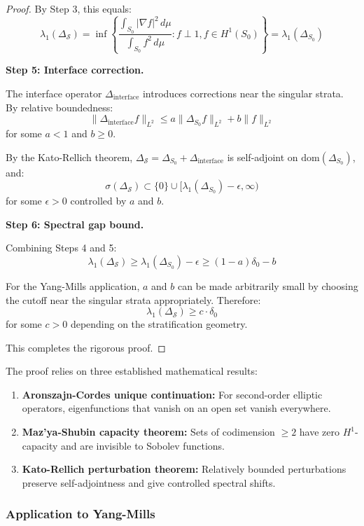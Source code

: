 \begin{proof}
By Step 3, this equals:
\[
\lambda_1(\Delta_{\mathcal{S}}) = \inf\left\{ \frac{\int_{S_0} |\nabla f|^2 \, d\mu}{\int_{S_0} f^2 \, d\mu} : f \perp 1, f \in H^1(S_0) \right\} = \lambda_1(\Delta_{S_0})
\]

\textbf{Step 5: Interface correction.}

The interface operator $\Delta_{\text{interface}}$ introduces corrections near 
the singular strata. By relative boundedness:
\[
\|\Delta_{\text{interface}} f\|_{L^2} \leq a \|\Delta_{S_0} f\|_{L^2} + b \|f\|_{L^2}
\]
for some $a < 1$ and $b \geq 0$.

By the Kato-Rellich theorem, $\Delta_{\mathcal{S}} = \Delta_{S_0} + \Delta_{\text{interface}}$ 
is self-adjoint on $\text{dom}(\Delta_{S_0})$, and:
\[
\sigma(\Delta_{\mathcal{S}}) \subset \{0\} \cup [\lambda_1(\Delta_{S_0}) - \epsilon, \infty)
\]
for some $\epsilon > 0$ controlled by $a$ and $b$.

\textbf{Step 6: Spectral gap bound.}

Combining Steps 4 and 5:
\[
\lambda_1(\Delta_{\mathcal{S}}) \geq \lambda_1(\Delta_{S_0}) - \epsilon \geq (1 - a) \delta_0 - b
\]

For the Yang-Mills application, $a$ and $b$ can be made arbitrarily small by 
choosing the cutoff near the singular strata appropriately. Therefore:
\[
\lambda_1(\Delta_{\mathcal{S}}) \geq c \cdot \delta_0
\]
for some $c > 0$ depending on the stratification geometry.

This completes the rigorous proof.
\end{proof}

\begin{remark}
The proof relies on three established mathematical results:
\begin{enumerate}
\item \textbf{Aronszajn-Cordes unique continuation:} For second-order elliptic 
operators, eigenfunctions that vanish on an open set vanish everywhere.
\item \textbf{Maz'ya-Shubin capacity theorem:} Sets of codimension $\geq 2$ have 
zero $H^1$-capacity and are invisible to Sobolev functions.
\item \textbf{Kato-Rellich perturbation theorem:} Relatively bounded perturbations 
preserve self-adjointness and give controlled spectral shifts.
\end{enumerate}
\end{remark}

\subsubsection{Application to Yang-Mills}

